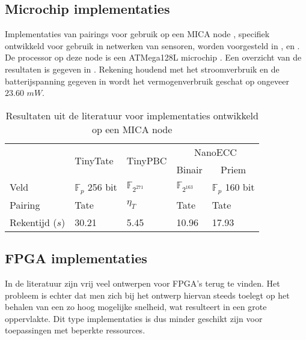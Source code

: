 \subsection{Microchip implementaties}

Implementaties van pairings voor gebruik op een MICA node \cite{mica}, specifiek ontwikkeld voor gebruik in netwerken van sensoren, worden voorgesteld in \cite{tinytate}, \cite{tinypbc} en \cite{nanoecc}. De processor op deze node is een ATMega128L microchip \cite{atmega}. Een overzicht van de resultaten is gegeven in . Rekening houdend met het stroomverbruik en de batterijspanning gegeven in \cite{nanoecc} wordt het vermogenverbruik geschat op ongeveer $23.60$ $mW$.

\begin{table}[h]
	\caption[Resultaten uit de literatuur voor implementaties ontwikkeld op een MICA node]{Resultaten uit de literatuur voor implementaties ontwikkeld op een MICA node \cite{mica}}
	\label{tabel-resultaten-sensor}

	\centering
	\begin{tabular}{lllll}
		\toprule
		& \multirow{2}{*}{TinyTate \cite{tinytate}}	& \multirow{2}{*}{TinyPBC \cite{tinypbc}} &	\multicolumn{2}{c}{NanoECC \cite{nanoecc}}\\
		\cmidrule{4-5}
		& & & \multicolumn{1}{c}{Binair} & \multicolumn{1}{c}{Priem}\\
			\midrule
		Veld					& $\mathbb{F}_{p}$ 256 bit	& $\mathbb{F}_{2^{271}}$	& $\mathbb{F}_{2^{163}}$	& $\mathbb{F}_{p}$ 160 bit\\
		Pairing				& Tate							& $\eta_T$ 						& Tate							& Tate\\
		Rekentijd ($s$)	& 30.21							& 5.45							& 10.96							& 17.93\\
		\bottomrule
	\end{tabular}
\end{table}

\subsection{FPGA implementaties}

In de literatuur zijn vrij veel ontwerpen voor FPGA's terug te vinden. Het probleem is echter dat men zich bij het ontwerp hiervan steeds toelegt op het behalen van een zo hoog mogelijke snelheid, wat resulteert in een grote oppervlakte. Dit type implementaties is dus minder geschikt zijn voor toepassingen met beperkte ressources.

